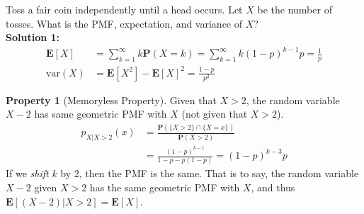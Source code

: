 \documentclass[device=normal, lang=en, fontsize=12pt]{elegantnote}
\numberwithin{equation}{section}
\theoremstyle{definition} %
\newtheorem{property}{Property}[section] %
\begin{document}
\begin{example}
    Toss a fair coin independently until a head occurs. Let $X$ be the number of tosses. What is the PMF, expectation, and variance of $X$? \\ 
    \textbf{Solution 1:} 
    \begin{equation}
    \begin{aligned}
        \mathbf{E}[X] &= \sum_{k=1}^{\infty} k \mathbf{P}(X = k) = \sum_{k=1}^{\infty} k (1-p)^{k-1} p = \frac{1}{p} \\ 
        \text{var}(X) &= \mathbf{E}[X^{2}] - \mathbf{E}[X]^{2} = \frac{1-p}{p^{2}}
    \end{aligned}
    \end{equation}
\end{example}
\begin{property}[Memoryless Property]
    Given that $X > 2$, the random variable $X - 2$ has same geometric PMF with $X$ (not given that $X > 2$). 
    \begin{equation}
    \begin{aligned}
        p_{X|X > 2}(x) &= \frac{\mathbf{P}(\{X > 2\} \cap \{X = x\})}{\mathbf{P}(X > 2)} \\ 
        &= \frac{(1 - p)^{k-1}}{1 - p - p(1-p)} = (1-p)^{k-3}p
    \end{aligned}
    \end{equation}
    If we \textit{shift} $k$ by 2, then the PMF is the same. That is to say, the random variable $X - 2$ given $X > 2$ has the same geometric PMF with $X$, and thus $\mathbf{E}[(X - 2)|X > 2] = \mathbf{E}[X]$.
\end{property}
\end{document}
